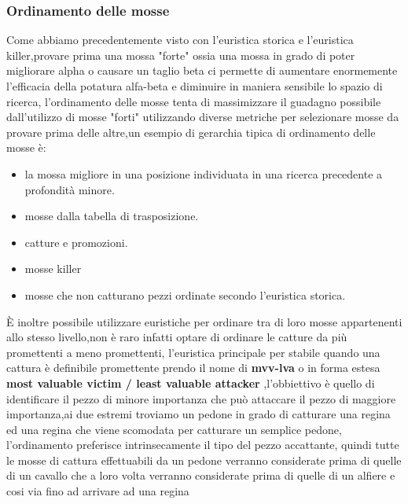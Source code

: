 \subsubsection{Ordinamento delle mosse}
Come abbiamo precedentemente visto con l'euristica storica e l'euristica killer,provare prima una mossa "forte" ossia una mossa in grado di 
poter migliorare alpha o causare un taglio beta ci permette di aumentare enormemente l'efficacia della potatura alfa-beta e diminuire in maniera 
sensibile lo spazio di ricerca, l'ordinamento delle mosse tenta di massimizzare il guadagno possibile dall'utilizzo di mosse "forti" utilizzando 
diverse metriche per selezionare mosse da provare prima delle altre,un esempio di gerarchia tipica di ordinamento delle mosse è:
\begin{itemize}
\item la mossa migliore in una posizione individuata in una ricerca precedente a profondità minore.
\item mosse dalla tabella  di trasposizione.
\item catture e promozioni.
\item mosse killer
\item mosse che non catturano pezzi ordinate secondo l'euristica storica.
\end{itemize} 
È inoltre possibile utilizzare euristiche per ordinare tra di loro mosse appartenenti allo stesso livello,non è raro infatti optare di ordinare le catture da più promettenti a meno promettenti,
l'euristica principale per stabile quando una cattura è definibile promettente prendo il nome di \textbf{mvv-lva} o in forma estesa \textbf{most valuable victim / least valuable attacker} ,l'obbiettivo è quello di identificare 
il pezzo di minore importanza che può attaccare il pezzo di maggiore importanza,ai due estremi troviamo un pedone in grado di catturare una regina ed una regina che viene scomodata per catturare un semplice pedone,
l'ordinamento preferisce intrinsecamente il tipo del pezzo accattante, quindi tutte le mosse di cattura effettuabili da un pedone verranno considerate prima di quelle di un cavallo che a loro volta verranno considerate
prima di quelle di un alfiere e cosi via fino ad arrivare ad una regina 


